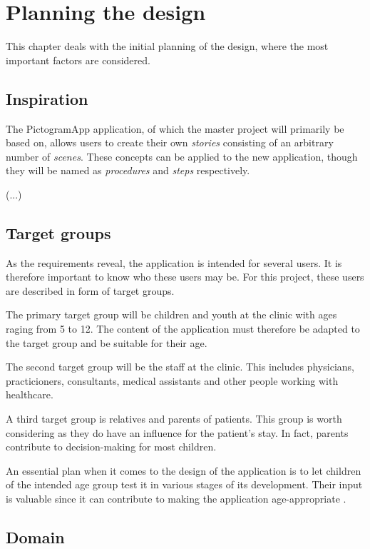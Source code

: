 \chapter{Planning the design}
\label{ch:planning}

This chapter deals with the initial planning of the design, where the most important factors are considered.

\section{Inspiration}

The PictogramApp application, of which the master project will primarily be based on, allows users to create their own \emph{stories} consisting of an arbitrary number of \emph{scenes}. These concepts can be applied to the new application, though they will be named as \emph{procedures} and \emph{steps} respectively.

(...)

\section{Target groups}

As the requirements reveal, the application is intended for several users. It is therefore important to know who these users may be. For this project, these users are described in form of target groups.

The primary target group will be children and youth at the clinic with ages raging from 5 to 12. The content of the application must therefore be adapted to the target group and be suitable for their age.

The second target group will be the staff at the clinic. This includes physicians, practicioners, consultants, medical assistants and other people working with healthcare.

A third target group is relatives and parents of patients. This group is worth considering as they do have an influence for the patient's stay. In fact, parents contribute to decision-making for most children.

An essential plan when it comes to the design of the application is to let children of the intended age group test it in various stages of its development. Their input is valuable since it can contribute to making the application age-appropriate \parencite{stalberg2016}.

\section{Domain}

